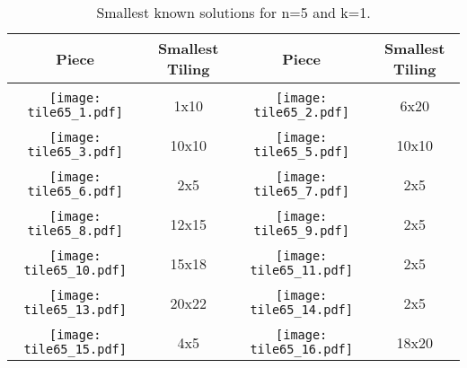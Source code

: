 \documentclass[10pt,a4paper]{article}
\theoremstyle{definition}
\begin{document}
\begin{table}[!htpb]
\centering
\begin{tabular}{|c|c|c|c|}
\hline
Piece & Smallest Tiling & Piece & Smallest Tiling\\ \hline
& & & \\ 
\texttt{[image: tile65\_1.pdf]} & 1x10 & \texttt{[image: tile65\_2.pdf]} & 6x20 \\ \hline
& & & \\ 
\texttt{[image: tile65\_3.pdf]} & 10x10 & \texttt{[image: tile65\_5.pdf]} & 10x10 \\ \hline
& & & \\ 
\texttt{[image: tile65\_6.pdf]} & 2x5 & \texttt{[image: tile65\_7.pdf]} & 2x5 \\ \hline
& & & \\ 
\texttt{[image: tile65\_8.pdf]} & 12x15 & \texttt{[image: tile65\_9.pdf]} & 2x5 \\ \hline
& & & \\ 
\texttt{[image: tile65\_10.pdf]} & 15x18 & \texttt{[image: tile65\_11.pdf]} & 2x5 \\ \hline
& & & \\ 
\texttt{[image: tile65\_13.pdf]} & 20x22 & \texttt{[image: tile65\_14.pdf]} & 2x5 \\ \hline
& & & \\ 
\texttt{[image: tile65\_15.pdf]} & 4x5 & \texttt{[image: tile65\_16.pdf]} & 18x20 \\ \hline
\end{tabular}
\caption{Smallest known solutions for n=5 and k=1.}
\label{tab:trivial-51a}
\end{table}
\end{document}

